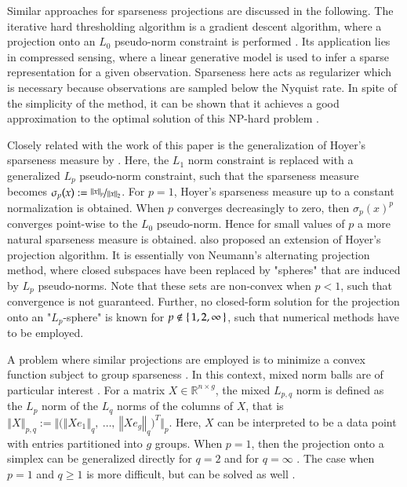 \documentclass[twoside,11pt]{article}
\newcommand{\tdvectbig}[2]{\big(#1,\ \dots,\ #2\big)\transp}
\newcommand{\R}{\mathbb{R}}
\newcommand{\0}{\mathcal{O}}
\newcommand{\transp}{^T}
\newcommand{\norm}[1]{\left\Vert#1\right\Vert}
\newcommand{\bnorm}[1]{\big\Vert#1\big\Vert}
\begin{document}
Similar approaches for sparseness projections are discussed in the following.
The iterative hard thresholding algorithm is a gradient descent algorithm, where a projection onto an $L_0$ pseudo-norm constraint is performed \citep{Blumensath2009}.
Its application lies in compressed sensing, where a linear generative model is used to infer a sparse representation for a given observation.
Sparseness here acts as regularizer which is necessary because observations are sampled below the Nyquist rate.
In spite of the simplicity of the method, it can be shown that it achieves a good approximation to the optimal solution of this NP-hard problem \citep{Blumensath2009}.

Closely related with the work of this paper is the generalization of Hoyer's sparseness measure by \citet{Theis2006}.
Here, the $L_1$ norm constraint is replaced with a generalized $L_p$ pseudo-norm constraint, such that the sparseness measure becomes $\sigma_p(x) := \nicefrac{\norm{x}_p}{\norm{x}_2}$.
For $p = 1$, Hoyer's sparseness measure up to a constant normalization is obtained.
When $p$ converges decreasingly to zero, then $\sigma_p(x)^p$ converges point-wise to the $L_0$ pseudo-norm.
Hence for small values of $p$ a more natural sparseness measure is obtained.
\citet{Theis2006} also proposed an extension of Hoyer's projection algorithm.
It is essentially von Neumann's alternating projection method, where closed subspaces have been replaced by "spheres" that are induced by $L_p$ pseudo-norms.
Note that these sets are non-convex when $p < 1$, such that convergence is not guaranteed.
Further, no closed-form solution for the projection onto an "$L_p$-sphere" is known for $p\not\in\set{1, 2, \infty}$, such that numerical methods have to be employed.

A problem where similar projections are employed is to minimize a convex function subject to group sparseness \citep[see for example][]{Friedman2010}.
In this context, mixed norm balls are of particular interest \citep{Sra2012}.
For a matrix $X\in\R^{n\times g}$, the mixed $L_{p,q}$ norm is defined as the $L_p$ norm of the $L_q$ norms of the columns of $X$, that is $\norm{X}_{p, q} := \bnorm{\tdvectbig{\norm{Xe_1}_q}{\norm{Xe_g}_q}}_p$.
Here, $X$ can be interpreted to be a data point with entries partitioned into $g$ groups.
When $p = 1$, then the projection onto a simplex can be generalized directly for $q = 2$ \citep{Berg2008} and for $q = \infty$ \citep{Quattoni2009}.
The case when $p = 1$ and $q\geq 1$ is more difficult, but can be solved as well \citep{Liu2010,Sra2012}.
\end{document}

